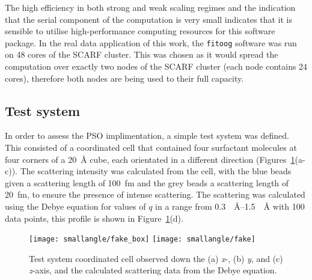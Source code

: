 The high efficiency in both strong and weak scaling regimes and the indication that the serial component of the computation is very small indicates that it is sensible to utilise high-performance computing resources for this software package.
In the real data application of this work, the \texttt{fitoog} software was run on 48 cores of the SCARF cluster.
This was chosen as it would spread the computation over exactly two nodes of the SCARF cluster (each node contains 24 cores), therefore both nodes are being used to their full capacity.

\subsection{Test system}
In order to assess the PSO implimentation, a simple test system was defined.
This consisted of a coordinated cell that contained four surfactant molecules at four corners of a \SI{20}{\angstrom} cube, each orientated in a different direction (Figures~\ref{fig:test}(a-c)).
The scattering intensity was calculated from the cell, with the blue beads given a scattering length of \SI{100}{\femto\meter} and the grey beads a scattering length of \SI{20}{\femto\meter}, to ensure the presence of intense scattering.
The scattering was calculated using the Debye equation \cite{debye_zerstreuung_1915} for values of $q$ in a range from \SIrange{0.3}{1.5}{\per\angstrom} with 100 data points, this profile is shown in Figure~\ref{fig:test}(d).
%
\begin{figure}
    \centering
    \texttt{[image: smallangle/fake\_box]}
    \texttt{[image: smallangle/fake]}
    \caption{Test system coordinated cell observed down the (a) \emph{x}-, (b) \emph{y}, and (c) \emph{z}-axis, and the calculated scattering data from the Debye equation.}
    \label{fig:test}
\end{figure}
%

